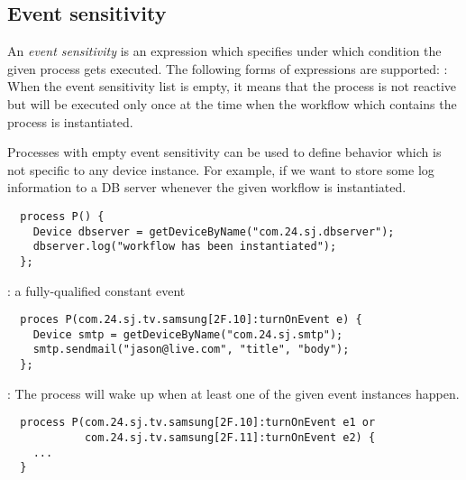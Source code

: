 \documentclass{myproc}
\begin{document}



\subsection{Event sensitivity} 
An {\em event sensitivity\/} is an expression which specifies under which
condition the given process gets executed. The following forms of expressions
are supported:
\bit
\w {}: When the event sensitivity list is empty, it means that
  the process is not reactive but will be executed only once at the time when
  the workflow which contains the process is instantiated. 

  Processes with empty event sensitivity can be used to define behavior which
  is not specific to any device instance. For example, if we want to store
  some log information to a DB server whenever the given workflow is
  instantiated. 
  \begin{verbatim}
  process P() {
    Device dbserver = getDeviceByName("com.24.sj.dbserver");
    dbserver.log("workflow has been instantiated");
  };
  \end{verbatim}

\w {}: a fully-qualified constant event
  \begin{verbatim}
  proces P(com.24.sj.tv.samsung[2F.10]:turnOnEvent e) {
    Device smtp = getDeviceByName("com.24.sj.smtp");
    smtp.sendmail("jason@live.com", "title", "body");
  };
  \end{verbatim}
\w {}: The process will wake up when at least one of
the given event instances happen.
  \begin{verbatim}
  process P(com.24.sj.tv.samsung[2F.10]:turnOnEvent e1 or
            com.24.sj.tv.samsung[2F.11]:turnOnEvent e2) {
    ...
  }
  \end{verbatim}
\end{document}
